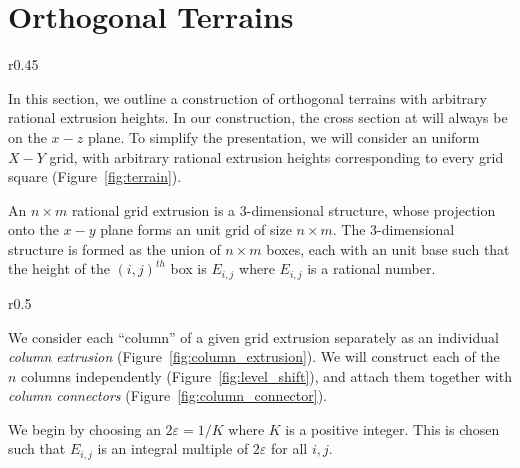 \section{Orthogonal Terrains}
\label{sec:orthogonal_terrains}

\graphicspath{{./notebooks/}}%
\begin{wrapfigure}[7]{r}{0.45\textwidth}
    \vspace{-2.7em}
    \def\svgwidth{0.45\textwidth}
    
    \caption{Example orthogonal terrain.}
    \label{fig:terrain}
    \vspace{-1.2em}
\end{wrapfigure}
In this section, we outline a construction of orthogonal terrains with arbitrary rational extrusion heights.
In our construction, the cross section at will always be on the $x-z$ plane.
To simplify the presentation, we will consider an uniform $X-Y$ grid,
with arbitrary rational extrusion heights corresponding to every grid square (Figure~\ref{fig:terrain}).
\begin{definition}
An $n\times m$ rational grid extrusion is a 3-dimensional structure,
whose projection onto the $x-y$ plane forms an unit grid of size $n\times m$.
The 3-dimensional structure is formed as the union of $n\times m$ boxes, each with an unit base
such that the height of the $(i,j)^{th}$ box is $E_{i,j}$ where $E_{i, j}$ is a rational number.
\end{definition}

\graphicspath{{./figures/}}
\begin{wrapfigure}[7]{r}{0.5\textwidth}
    \vspace{-2.2em}
    \def\svgwidth{0.5\textwidth}
    \caption{Column extrusion with heights $\left\{ 0,1,3,1,2,0\right\}$.}
    \label{fig:column_extrusion}
    \vspace{-0.8em}
\end{wrapfigure}
We consider each ``column'' of a given grid extrusion separately
as an individual \emph{column extrusion} (Figure~\ref{fig:column_extrusion}).
We will construct each of the $n$ columns independently (Figure~\ref{fig:level_shift}),
and attach them together with \emph{column connectors} (Figure~\ref{fig:column_connector}).

We begin by choosing an $2\varepsilon=1/K$ where $K$ is a positive integer.
This is chosen such that $E_{i,j}$ is an integral multiple of $2\varepsilon$ for all $i,j$.






%
%

